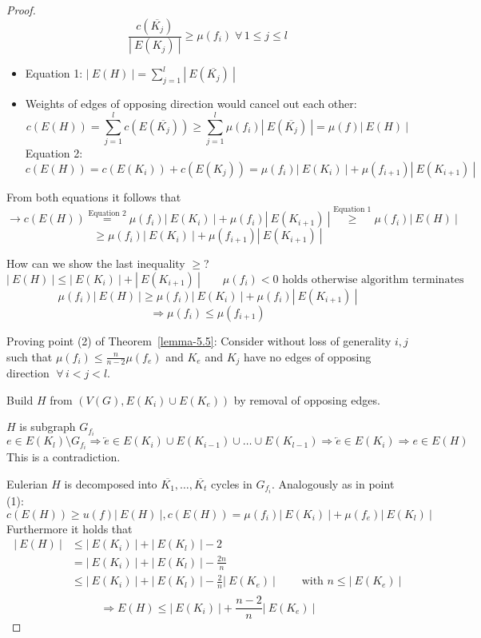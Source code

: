 \documentclass{article}
\newcommand{\card}[1]{\left|\:\!#1\:\!\right|}
\newcommand{\fall}{\;\forall\,}
\begin{document}
\begin{proof}
  \[ \frac{c(\overline{K_j})}{\card{E(K_j)}} \geq \mu(f_i) \fall 1 \leq j \leq l \]
  \begin{itemize}
    \item Equation 1:
      $\card{E(H)} = \sum_{j=1}^l \card{E(\overline{K_j})}$
    \item Weights of edges of opposing direction would cancel out each other:
      \[ c(E(H)) = \sum_{j=1}^l c(E(\overline{K_j}))
        \geq \sum_{j=1}^l \mu(f_i) \card{E(\overline{K_j})} = \mu(f) \card{E(H)} \]
      Equation 2:
      \[ c(E(H)) = c(E(K_i)) + c(E(K_{j})) = \mu(f_i) \card{E(K_i)} + \mu(f_{i+1}) \card{E(K_{i+1})} \]
  \end{itemize}
  From both equations it follows that
  \[
    \rightarrow c(E(H))
      \stackrel{\text{Equation 2}}{=} \mu(f_i) \card{E(K_i)} + \mu(f_i) \card{E(K_{i+1})}
      \stackrel{\text{Equation 1}}{\geq} \mu(f_i) \card{E(H)}
  \] \[
      \geq \mu(f_i) \card{E(K_i)} + \mu(f_{i+1}) \card{E(K_{i+1})}
  \]

  How can we show the last inequality $\geq$?
  \[
    \card{E(H)} \leq \card{E(K_i)} + \card{E(K_{i+1})} \qquad \mu(f_i) < 0 \text{ holds otherwise algorithm terminates}
  \] \[
    \mu(f_i) \card{E(H)} \geq \mu(f_i) \card{E(K_i)} + \mu(f_i) \card{E(K_{i+1})}
  \] \[
    \Rightarrow \mu(f_i) \leq \mu(f_{i+1})
  \]

  Proving point (2) of Theorem~\ref{lemma-5.5}: Consider without loss of generality $i,j$ such that $\mu(f_i) \leq \frac{n}{n-2} \mu(f_e)$ and $K_e$ and $K_j$ have no edges of opposing direction $\fall i < j < l$.

  Build $H$ from $(V(G), E(K_i) \cup E(K_e))$ by removal of opposing edges.

  $H$ is subgraph $G_{f_i}$
  \[ e \in E(K_l) \setminus G_{f_i} \Rightarrow \overleftarrow{e} \in E(K_i) \cup E(K_{i-1}) \cup \ldots \cup E(K_{l-1}) \Rightarrow \overleftarrow{e} \in E(K_i) \Rightarrow e \in E(H) \]
  This is a contradiction.

  Eulerian $H$ is decomposed into $\overline{K_1}, \ldots, \overline{K_t}$ cycles in $G_{f_i}$.
  Analogously as in point (1):
  \[ c(E(H)) \geq u(f) \card{E(H)}, c(E(H)) = \mu(f_i) \card{E(K_i)} + \mu(f_e) \card{E(K_l)} \]
  Furthermore it holds that
  \begin{align*}
    \card{E(H)}
      & \leq \card{E(K_i)} + \card{E(K_l)} - 2 \\
      & = \card{E(K_i)} + \card{E(K_l)} - \frac{2n}{n} \\
      & \leq \card{E(K_i)} + \card{E(K_l)} - \frac2n \card{E(K_e)} \qquad \text{ with } n \leq \card{E(K_e)} \\
  \end{align*}
  \[
    \Rightarrow E(H) \leq \card{E(K_i)} + \frac{n-2}{n} \card{E(K_e)}
  \]


\end{proof}
\end{document}
